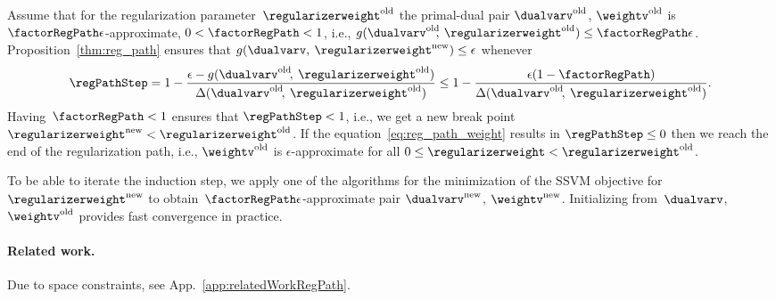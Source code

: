 \documentclass{article}
\begin{document}
Assume that for the regularization parameter~$\regularizerweight^{\text{old}}$ the primal-dual pair $\dualvarv^{\text{old}}$\!, $\weightv^{\text{old}}$ is $\factorRegPath\epsilon$-approximate, $0<\factorRegPath<1$, i.e., $g(\dualvarv^{\text{old}}\!\!,\: \regularizerweight^{\text{old}}) \leq \factorRegPath\epsilon$.
Proposition~\ref{thm:reg_path} ensures that $g(\dualvarv,\: \regularizerweight^{\text{new}}) \leq \epsilon$ whenever\\[-0.15cm]
\begin{equation}\label{eq:reg_path_weight}
\regPathStep 
= 
1 - \frac{\epsilon - g(\dualvarv^{\text{old}}\!,\: \regularizerweight^{\text{old}})}{\Delta(\dualvarv^{\text{old}}\!,\: \regularizerweight^{\text{old}})}
\leq 1 - \frac{\epsilon(1-\factorRegPath)}{\Delta(\dualvarv^{\text{old}}\!,\: \regularizerweight^{\text{old}})}.
\end{equation}
Having~$\factorRegPath<1$ ensures that $\regPathStep < 1$, i.e., we get a new break point $\regularizerweight^{\text{new}} < \regularizerweight^{\text{old}}$.
If the equation~\eqref{eq:reg_path_weight} results in $\regPathStep\leq 0$ then we reach the end of the regularization path, i.e., $\weightv^{\text{old}}$ is $\epsilon$-approximate for all $0 \leq \regularizerweight < \regularizerweight^{\text{old}}$.

To be able to iterate the induction step, we apply one of the algorithms for the minimization of the SSVM objective for~$\regularizerweight^{\text{new}}$ to obtain~$\factorRegPath\epsilon$-approximate pair $\dualvarv^{\text{new}}$, $\weightv^{\text{new}}$\!. Initializing from~$\dualvarv$, $\weightv^{\text{old}}$ provides fast convergence in practice.

%
%
%
%
%
%
%
%
%








%
%
%
%
%
%
%
%
%
%
%
%
%
%
%
%
%
%
%
%
%

 

%
%
%
%
%
%
%
%
%
%
%
%
%
%
%
%
%
%
%
%
%
%
%
%
%
%
%
%
%
%
%
%
%
%
%

%
\paragraph{Related work.} Due to space constraints, see App.~\ref{app:relatedWorkRegPath}.
\end{document}
